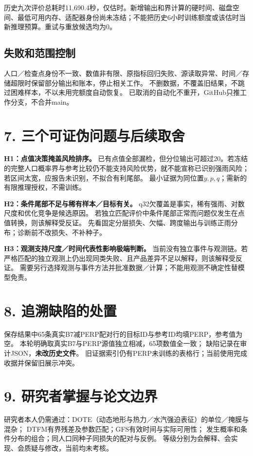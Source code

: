 \documentclass[UTF8,a4paper,10pt,fontset=none]{ctexart}
\begin{document}
历史九次评价总耗时11,690.4秒，仅估时。新增输出和界计算的硬时间、磁盘空间、最低可用内存、适配器身份尚未冻结；不能把历史6小时训练额度或该估时当新推理预算。重试与重放候选均为0。

\subsection*{失败和范围控制}
人口／检查点身份不一致、数值非有限、原指标回归失败、源读取异常、时间／存储超限时保留部分输出和账本，停止相关工作。
不删数据，不覆盖旧结果，不跳过困难样本，不以未用完额度自动恢复。
已取消的自动化不重开，GitHub只推工作分支，不合并main。

\newpage
\section*{7. 三个可证伪问题与后续取舍}
\textbf{H1：点值决策掩盖风险排序。}
已有点值全部漏检，但分位输出可超过20。若冻结的完整人口概率界与参考比较仍不能支持风险优势，就不能宣称已识别强雨风险；若区间太宽，应报告未识别，不拟合有利尾部。
最小证据为同位置$y,p,q$；需新的有限推理授权，不需训练。

\textbf{H2：条件尾部不足与稀有样本／目标有关。}
q32欠覆盖是事实，稀有强雨、对数尺度和优化竞争是候选原因。
若独立匹配评价中条件尾部正常而问题仅发生在点值转换，则该解释受反证。
先看固定分层损失、欠幅、跨度输出与训练正雨分布；诊断前不改损失、不补种子。

\textbf{H3：观测支持尺度／时间代表性影响极端判断。}
当前没有独立事件与观测链。若严格匹配的独立观测上仍出现同类失败、且产品差异不足以解释，则该解释受反证。
需要另行选择观测与事件方法并批准数据／计算；不能用观测不确定性替模型免责。

\section*{8. 追溯缺陷的处置}
保存结果中65条真实B7减PERP配对行的目标ID与参考ID均填PERP，参考值为空。
本轮明确取真实B7与PERP源值独立相减，65项数值全一致；
缺陷记录在审计JSON，\textbf{未改历史文件}。
旧证据索引仍有PERP未训练的表格行；当前使用完成收据并保留旧展示冲突。

\section*{9. 研究者掌握与论文边界}
研究者本人仍需通过：DOTE（动态地形与热力／水汽强迫表征）的单位／掩膜与混杂；
DTFM有界残差及参数匹配；GFS有效时间与实际可用性；
发生概率和条件分布的组合；同人口同种子同损失的配对与反例。
等级分别为会解释、会实现、会质疑与修改，当前均未考核。
\end{document}
